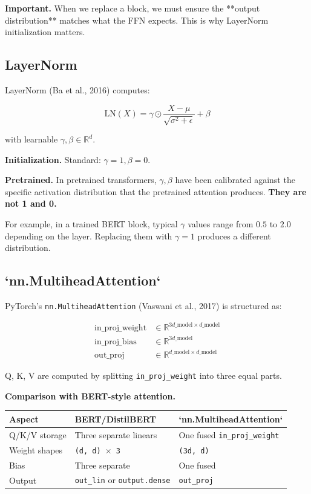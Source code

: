 \textbf{Important.} When we replace a block, we must ensure the **output 
distribution** matches what the FFN expects. This is why LayerNorm 
initialization matters.

\subsection{LayerNorm}

LayerNorm (Ba et al., 2016) computes:

\[
\text{LN}(X) = \gamma \odot \frac{X - \mu}{\sqrt{\sigma^2 + \epsilon}} + \beta
\tag{3.2}
\]

with learnable $\gamma, \beta \in \mathbb{R}^d$.

\textbf{Initialization.} Standard: $\gamma = 1, \beta = 0$.

\textbf{Pretrained.} In pretrained transformers, $\gamma, \beta$ have been 
calibrated against the specific activation distribution that the pretrained 
attention produces. \textbf{They are not 1 and 0.}

For example, in a trained BERT block, typical $\gamma$ values range from 
$0.5$ to $2.0$ depending on the layer. Replacing them with $\gamma = 1$ 
produces a different distribution.

\subsection{`nn.MultiheadAttention`}

PyTorch's \texttt{nn.MultiheadAttention} (Vaswani et al., 2017) is structured as:

\[
\begin{aligned}
\text{in\_proj\_weight} &\in \mathbb{R}^{3 d\_\text{model} \times d\_\text{model}} \\
\text{in\_proj\_bias} &\in \mathbb{R}^{3 d\_\text{model}} \\
\text{out\_proj} &\in \mathbb{R}^{d\_\text{model} \times d\_\text{model}}
\end{aligned}
\tag{3.3}
\]

Q, K, V are computed by splitting \texttt{in\_proj\_weight} into three equal parts.

\textbf{Comparison with BERT-style attention.}

\begin{table}[H]
\centering
\small
\begin{tabular}{lll}
\toprule
\textbf{Aspect} & \textbf{BERT/DistilBERT} & \textbf{`nn.MultiheadAttention`} \\
\midrule
Q/K/V storage & Three separate linears & One fused \texttt{in\_proj\_weight} \\
Weight shapes & \texttt{(d, d) $\times$ 3} & \texttt{(3d, d)} \\
Bias & Three separate & One fused \\
Output & \texttt{out\_lin} or \texttt{output.dense} & \texttt{out\_proj} \\
\bottomrule
\end{tabular}
\end{table}

